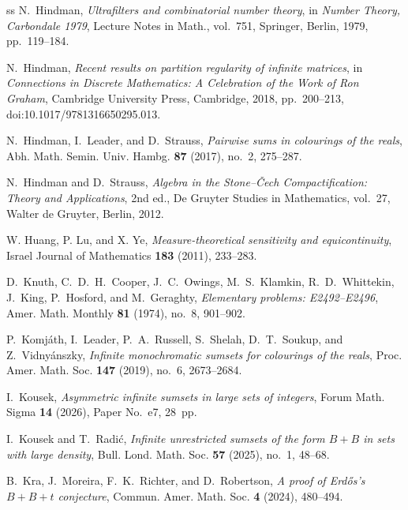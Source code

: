 \documentclass[reqno,12pt]{amsart}
\numberwithin{equation}{section}
\begin{document}
\begin{thebibliography}{ss}
N.~Hindman,
\emph{Ultrafilters and combinatorial number theory},
in \emph{Number Theory, Carbondale 1979},
Lecture Notes in Math., vol.~751,
Springer, Berlin, 1979, pp.~119--184.

N.~Hindman,
\emph{Recent results on partition regularity of infinite matrices},
in \emph{Connections in Discrete Mathematics:
A Celebration of the Work of Ron Graham},
Cambridge University Press, Cambridge, 2018, pp.~200--213,
doi:10.1017/9781316650295.013.

N.~Hindman, I.~Leader, and D.~Strauss,
\emph{Pairwise sums in colourings of the reals},
Abh. Math. Semin. Univ. Hambg. \textbf{87} (2017), no.~2,
275--287.

N.~Hindman and D.~Strauss,
\emph{Algebra in the Stone--\v{C}ech Compactification:
Theory and Applications},
2nd ed., De Gruyter Studies in Mathematics, vol.~27,
Walter de Gruyter, Berlin, 2012.

W. Huang, P. Lu, and X. Ye,
\emph{Measure-theoretical sensitivity and
equicontinuity},
 Israel Journal of Mathematics \textbf{183} (2011), 233--283.

D.~Knuth, C.~D.~H.~Cooper, J.~C.~Owings, M.~S.~Klamkin,
R.~D.~Whittekin, J.~King, P.~Hosford, and M.~Geraghty,
\emph{Elementary problems: E2492--E2496},
Amer. Math. Monthly \textbf{81} (1974), no.~8, 901--902.

P.~Komj\'ath, I.~Leader, P.~A.~Russell, S.~Shelah,
D.~T.~Soukup, and Z.~Vidny\'anszky,
\emph{Infinite monochromatic sumsets for colourings of the reals},
Proc. Amer. Math. Soc. \textbf{147} (2019), no.~6,
2673--2684.

I.~Kousek,
\emph{Asymmetric infinite sumsets in large sets of integers},
Forum Math. Sigma \textbf{14} (2026), Paper No.~e7, 28~pp.


I.~Kousek and T.~Radi\'c,
\emph{Infinite unrestricted sumsets of the form $B+B$ in sets with
large density},
Bull. Lond. Math. Soc. \textbf{57} (2025), no.~1, 48--68.

B.~Kra, J.~Moreira, F.~K.~Richter, and D.~Robertson,
\emph{A proof of Erd{\H{o}}s's $B+B+t$ conjecture},
Commun. Amer. Math. Soc. \textbf{4} (2024), 480--494.


\end{thebibliography}
\end{document}

